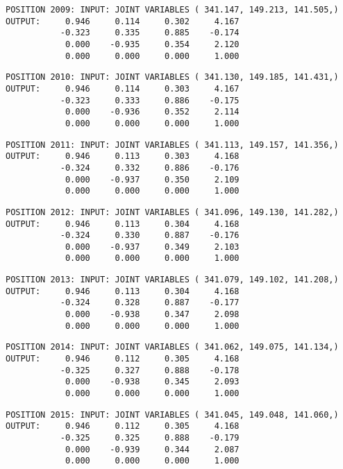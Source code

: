 \begin{verbatim}
POSITION 2009: INPUT: JOINT VARIABLES ( 341.147, 149.213, 141.505,)
OUTPUT:     0.946     0.114     0.302     4.167
           -0.323     0.335     0.885    -0.174
            0.000    -0.935     0.354     2.120
            0.000     0.000     0.000     1.000
\end{verbatim} \pagebreak[1]\begin{verbatim}
POSITION 2010: INPUT: JOINT VARIABLES ( 341.130, 149.185, 141.431,)
OUTPUT:     0.946     0.114     0.303     4.167
           -0.323     0.333     0.886    -0.175
            0.000    -0.936     0.352     2.114
            0.000     0.000     0.000     1.000
\end{verbatim} \pagebreak[1]\begin{verbatim}
POSITION 2011: INPUT: JOINT VARIABLES ( 341.113, 149.157, 141.356,)
OUTPUT:     0.946     0.113     0.303     4.168
           -0.324     0.332     0.886    -0.176
            0.000    -0.937     0.350     2.109
            0.000     0.000     0.000     1.000
\end{verbatim} \pagebreak[1]\begin{verbatim}
POSITION 2012: INPUT: JOINT VARIABLES ( 341.096, 149.130, 141.282,)
OUTPUT:     0.946     0.113     0.304     4.168
           -0.324     0.330     0.887    -0.176
            0.000    -0.937     0.349     2.103
            0.000     0.000     0.000     1.000
\end{verbatim} \pagebreak[1]\begin{verbatim}
POSITION 2013: INPUT: JOINT VARIABLES ( 341.079, 149.102, 141.208,)
OUTPUT:     0.946     0.113     0.304     4.168
           -0.324     0.328     0.887    -0.177
            0.000    -0.938     0.347     2.098
            0.000     0.000     0.000     1.000
\end{verbatim} \pagebreak[1]\begin{verbatim}
POSITION 2014: INPUT: JOINT VARIABLES ( 341.062, 149.075, 141.134,)
OUTPUT:     0.946     0.112     0.305     4.168
           -0.325     0.327     0.888    -0.178
            0.000    -0.938     0.345     2.093
            0.000     0.000     0.000     1.000
\end{verbatim} \pagebreak[1]\begin{verbatim}
POSITION 2015: INPUT: JOINT VARIABLES ( 341.045, 149.048, 141.060,)
OUTPUT:     0.946     0.112     0.305     4.168
           -0.325     0.325     0.888    -0.179
            0.000    -0.939     0.344     2.087
            0.000     0.000     0.000     1.000
\end{verbatim} \pagebreak[1]\begin{verbatim}

\end{verbatim}
